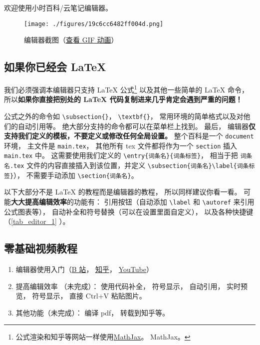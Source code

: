 
欢迎使用小时百科/云笔记编辑器。
\begin{figure}[ht]
\centering
\texttt{[image: ./figures/19c6cc6482ff004d.png]}
\caption{编辑器截图（\href{https://wuli.wiki/apps/editor.gif}{查看 GIF 动画}）} \label{fig_editor_3}
\end{figure}

\subsection{如果你已经会 LaTeX}
我们必须强调本编辑器只支持 LaTeX 公式\footnote{公式渲染和知乎等网站一样使用\href{https://www.mathjax.org/}{MathJax}。 MathJax。} 以及其他一些简单的 LaTeX 命令， 所以\textbf{如果你直接把别处的 LaTeX 代码复制进来几乎肯定会遇到严重的问题！}

公式之外的命令如 \verb|\subsection{}|， \verb|\textbf{}|， 常用环境的简单格式以及对他们的自动引用等。 绝大部分支持的命令都可以在菜单栏上找到。 最后， 编辑器\textbf{仅支持我们定义的模板，不要定义或修改任何全局设置。} 整个百科是一个 \verb|document| 环境， 主文件是 \verb|main.tex|， 其他所有 tex 文件都将作为一个 \verb|section| 插入 \verb|main.tex| 中。 这需要使用我们定义的 \verb|\entry{词条名}{词条标签}|， 相当于把 \verb|词条名.tex| 文件的内容直接插入到该位置，并定义 \verb|\subsection{词条名}\label{词条标签}|）， 不需要手动添加 \verb|\section{词条名}|。

以下大部分不是 LaTeX 的教程而是编辑器的教程， 所以同样建议你看一看。 可能\textbf{大大提高编辑效率}的功能有： 引用按钮（自动添加 \verb|\label| 和 \verb|\autoref| 来引用公式图表等）， 自动补全和符号替换（可以在设置里面自定义）， 以及各种快捷键（\autoref{tab_editor_1} ）。

\subsection{零基础视频教程}
\begin{enumerate}
\item 编辑器使用入门（\href{https://www.bilibili.com/video/av87698355/}{B 站}， \href{https://zhuanlan.zhihu.com/p/105869878}{知乎}， \href{https://www.youtube.com/watch?v=AN2tXNanD9U&t=1s}{YouTube}）
\item 提高编辑效率 （未完成）： 使用代码补全， 符号显示， 自动引用， 实时预览， 符号显示， 直接 Ctrl+V 粘贴图片。
\item 其他功能（未完成）： 编译 pdf， 转载到知乎等。
\end{enumerate}

